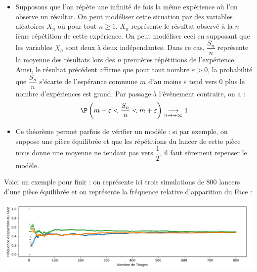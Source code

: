 \documentclass[french,11pt,twoside]{VcCours}
\begin{document}
\vspace{6cm}
\begin{Remarques}{}
\begin{itemize} 
\item Supposons que l'on répète une infinité de fois la même expérience où l'on observe un résultat. On peut modéliser cette situation par des variables aléatoires $X_n$ où pour tout $n \geq 1$, $X_n$ représente le résultat observé à la $n$-ième répétition de cette expérience. On peut modéliser ceci en supposant que les variables $X_n$ sont deux à deux indépendantes. Dans ce cas, $\dfrac{S_n}{n}$ représente la moyenne des résultats lors des $n$ premières répétitions de l'expérience. Ainsi, le résultat précédent affirme que pour tout nombre $\varepsilon>0$, la probabilité que $\dfrac{S_n}{n}$ s'écarte de l'espérance commune $m$ d'au moins $\varepsilon$ tend vers $0$ plus le nombre d'expériences est grand. Par passage à l'évènement contraire, on a :
$$ \P \left( m - \varepsilon < \dfrac{S_n}{n}< m + \varepsilon \right) \underset{n \rightarrow + \infty}{\longrightarrow} 1$$
\item Ce théorème permet parfois de vérifier un modèle : si par exemple, on suppose une pièce équilibrée et que les répétitions du lancer de cette pièce nous donne une moyenne ne tendant pas vers $\dfrac{1}{2}$, il faut sûrement repenser le modèle.
\end{itemize}
\end{Remarques}

\medskip

Voici un exemple pour finir : on représente ici trois simulations de 800 lancers d'une pièce équilibrée et on représente la fréquence relative d'apparition du Face :

\begin{center}
\includegraphics[scale=0.44]{Face}
\end{center}
\end{document}
